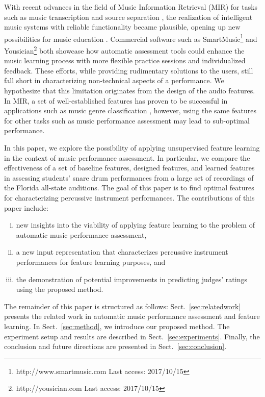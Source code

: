 \documentclass[conference]{IEEEtran}
\begin{document}
With recent advances in the field of Music Information Retrieval (MIR) for tasks such as music transcription \cite{Benetos2013} and source separation \cite{Huang2014}, the realization of intelligent music systems with reliable functionality became plausible, opening up new possibilities for music education \cite{Dittmar2012}. Commercial software such as SmartMusic\footnote{http://www.smartmusic.com Last access: 2017/10/15} and Yousician\footnote{http://yousician.com Last access: 2017/10/15} both showcase how automatic assessment tools could enhance the music learning process with more flexible practice sessions and individualized feedback. These efforts, while providing rudimentary solutions to the users, still fall short in characterizing non-technical aspects of a performance. We hypothesize that this limitation originates from the design of the audio features. In MIR, a set of well-established features has proven to be successful in applications such as music genre classification \cite{Tzanetakis2002}, however, using the same features for other tasks such as music performance assessment may lead to sub-optimal performance. %

In this paper, we explore the possibility of applying unsupervised feature learning in the context of music performance assessment. In particular, we compare the effectiveness of a set of baseline features, designed features, and learned features in assessing students' snare drum performances from a large set of recordings of the Florida all-state auditions. The goal of this paper is to find optimal features for characterizing percussive instrument performances. The contributions of this paper include:
\begin{enumerate}[(i)]
	\item   new insights into the viability of applying feature learning to the problem of automatic music performance assessment, 
    \item   a new input representation that characterizes percussive instrument performances for feature learning purposes, and 
    \item   the demonstration of potential improvements in predicting judges' ratings using the proposed method.
\end{enumerate} 

The remainder of this paper is structured as follows: Sect.~\ref{sec:relatedwork} presents the related work in automatic music performance assessment and feature learning. In Sect.~\ref{sec:method}, we introduce our proposed method. The experiment setup and results are described in Sect.~\ref{sec:experiments}. Finally, the conclusion and future directions are presented in Sect.~\ref{sec:conclusion}.
\end{document}
